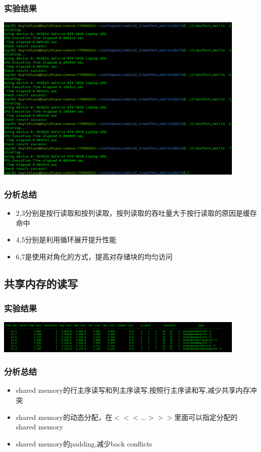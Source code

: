 \subsubsection{实验结果}
\noindent
\includegraphics[width=0.9\textwidth]{assets/diag.png}
\subsubsection{分析总结}
\noindent
\begin{itemize}
	\item 2,3分别是按行读取和按列读取，按列读取的吞吐量大于按行读取的原因是缓存命中
	\item 4,5分别是利用循环展开提升性能
	\item 6,7是使用对角化的方式，提高对存储块的均匀访问
\end{itemize}


\subsection{共享内存的读写}
\subsubsection{实验结果}
\noindent
\includegraphics[width=0.9\textwidth]{assets/sm.png}
\subsubsection{分析总结}
\noindent
\begin{itemize}
	\item shared memory的行主序读写和列主序读写,按照行主序读和写,减少共享内存冲突
	\item shared memory的动态分配，在$<<<...>>>$里面可以指定分配的shared memory
	\item shared memory的padding,减少back conflicts
\end{itemize}

